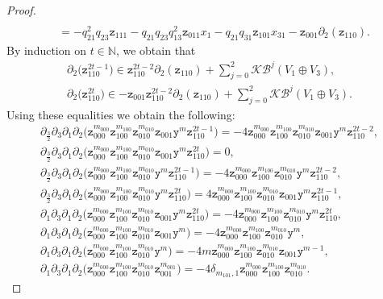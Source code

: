 \documentclass[10pt,a4paper]{amsart}
\numberwithin{equation}{section}
\newcommand{\toba}{\mathscr B}
\newcommand{\K}{{\mathcal{K}}}
\newcommand{\N}{{\mathbb N}}
\newcommand{\yt}{\mathtt{y}}
\newcommand{\zt}{\mathtt{z}}
\newcommand{\tresdos}{\frac{3}{2}}
\begin{document}
\begin{proof}
\begin{align*}
\\
& = -q_{21}^2q_{23} \zt_{111}
-q_{21}q_{23}q_{13}^2 \zt_{011}x_1
-q_{21}q_{31} \zt_{101}x_{31}
-\zt_{001}\partial_2(\zt_{110}).
\end{align*}
By induction on $t\in\N$, we obtain that
\begin{gather*}
\partial_2 \big(\zt_{110}^{2t-1}\big) \in \zt_{110}^{2t-2}\partial_2(\zt_{110})+ \sum_{j=0}^2 \K \toba^j(V_1\oplus V_3),
\\[-2mm]
\partial_2 \big(\zt_{110}^{2t}\big) \in -\zt_{001}\zt_{110}^{2t-2}\partial_2(\zt_{110})+ \sum_{j=0}^2 \K \toba^j(V_1\oplus V_3).
\end{gather*}
Using these equalities we obtain the following:
\begin{gather*}
 \partial_{\tresdos}\partial_3\partial_1\partial_2\big(\zt_{000}^{m_{000}} \zt_{100}^{m_{100}} \zt_{010}^{m_{010}} \zt_{001}\yt^m \zt_{110}^{2t-1}\big)=-4 \zt_{000}^{m_{000}} \zt_{100}^{m_{100}} \zt_{010}^{m_{010}}\zt_{001}\yt^m \zt_{110}^{2t-2},
\\
 \partial_{\tresdos}\partial_3\partial_1\partial_2\big(\zt_{000}^{m_{000}} \zt_{100}^{m_{100}} \zt_{010}^{m_{010}} \zt_{001}\yt^m \zt_{110}^{2t}\big)=0,
\\
 \partial_{\tresdos}\partial_3\partial_1\partial_2\big(\zt_{000}^{m_{000}} \zt_{100}^{m_{100}} \zt_{010}^{m_{010}}\yt^m \zt_{110}^{2t-1}\big)=-4 \zt_{000}^{m_{000}} \zt_{100}^{m_{100}} \zt_{010}^{m_{010}}\yt^m \zt_{110}^{2t-2},
\\
 \partial_{\tresdos}\partial_3\partial_1\partial_2\big(\zt_{000}^{m_{000}} \zt_{100}^{m_{100}} \zt_{010}^{m_{010}} \yt^m \zt_{110}^{2t}\big)=4 \zt_{000}^{m_{000}} \zt_{100}^{m_{100}} \zt_{010}^{m_{010}} \zt_{001}\yt^m \zt_{110}^{2t-1},
\\
 \partial_1\partial_3\partial_1\partial_2\big(\zt_{000}^{m_{000}} \zt_{100}^{m_{100}} \zt_{010}^{m_{010}} \zt_{001}\yt^m \zt_{110}^{2t}\big)=-4\zt_{000}^{m_{000}} \zt_{100}^{m_{100}} \zt_{010}^{m_{010}}\yt^m \zt_{110}^{2t},
\\
 \partial_1\partial_3\partial_1\partial_2\big(\zt_{000}^{m_{000}} \zt_{100}^{m_{100}} \zt_{010}^{m_{010}} \zt_{001}\yt^m\big)=-4\zt_{000}^{m_{000}} \zt_{100}^{m_{100}} \zt_{010}^{m_{010}}\yt^m,
\\
 \partial_1\partial_3\partial_1\partial_2\big(\zt_{000}^{m_{000}} \zt_{100}^{m_{100}} \zt_{010}^{m_{010}} \yt^m\big)=-4m\zt_{000}^{m_{000}} \zt_{100}^{m_{100}} \zt_{010}^{m_{010}}\zt_{001}\yt^{m-1},
\\
 \partial_1\partial_3\partial_1\partial_2\big(\zt_{000}^{m_{000}} \zt_{100}^{m_{100}} \zt_{010}^{m_{010}} \zt_{001}^{m_{001}}\big)=-4\delta_{m_{101},1} \zt_{000}^{m_{000}} \zt_{100}^{m_{100}} \zt_{010}^{m_{010}}.

\end{gather*}
\end{proof}
\end{document}
